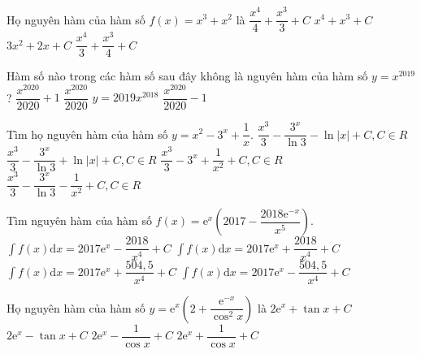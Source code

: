 \begin{ex}
	Họ nguyên hàm của hàm số $ f(x)=x^3+x^2$ là
	\choice
	{\True $\dfrac{x^4}{4}+\dfrac{x^3}{3}+C$}
	{$x^4+x^3+C$}
	{$ 3x^2+2x+C$}
	{$\dfrac{x^4}{3}+\dfrac{x^3}{4}+C$}
\end{ex}
\begin{ex}
	Hàm số nào trong các hàm số sau đây không là nguyên hàm của hàm số $ y=x^{2019}$?
	\choice
	{$\dfrac{x^{2020}}{2020}+1$}
	{$\dfrac{x^{2020}}{2020}$}
	{\True $ y=2019x^{2018}$}
	{$\dfrac{x^{2020}}{2020}-1$}
\end{ex}
\begin{ex}
	Tìm họ nguyên hàm của hàm số $ y=x^2-3^x+\dfrac{1}{x}$.
	\choice
	{$\dfrac{x^3}{3}-\dfrac{3^x}{\ln 3}-\ln \left| x\right|+C,C\in R$}
	{\True $\dfrac{x^3}{3}-\dfrac{3^x}{\ln 3}+\ln \left| x\right|+C,C\in R$}
	{$\dfrac{x^3}{3}-3^x+\dfrac{1}{x^2}+C,C\in R$}
	{$\dfrac{x^3}{3}-\dfrac{3^x}{\ln 3}-\dfrac{1}{x^2}+C,C\in R$}
\end{ex}
\begin{ex}
	Tìm nguyên hàm của hàm số $ f(x)=\mathrm{e}^x\left(2017-\dfrac{2018\mathrm{e}^{-x}}{x^5}\right)$.
	\choice
	{$\displaystyle\int{f(x)\mathrm{d}x}=2017\mathrm{e}^x-\dfrac{2018}{x^4}+C$}
	{$\displaystyle\int{f(x)\mathrm{d}x}=2017\mathrm{e}^x+\dfrac{2018}{x^4}+C$}
	{\True $\displaystyle\int{f(x)\mathrm{d}x}=2017\mathrm{e}^x+\dfrac{504,5}{x^4}+C$}
	{$\displaystyle\int{f(x)\mathrm{d}x}=2017\mathrm{e}^x-\dfrac{504,5}{x^4}+C$}
\end{ex}
\begin{ex}
	Họ nguyên hàm của hàm số $y=\mathrm{e}^x\left(2+\dfrac{\mathrm{e}^{-x}}{\cos^2x}\right)$ là
	\choice
	{\True $2\mathrm{e}^x+\tan x+C$}
	{$2\mathrm{e}^x-\tan x+C$}
	{$2\mathrm{e}^x-\dfrac{1}{\cos x}+C$}
	{$2\mathrm{e}^x+\dfrac{1}{\cos x}+C$}
\end{ex}
